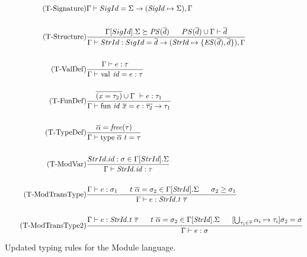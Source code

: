 \begin{figure}[htbp]
\begin{align*}
\tag{T-Signature}
&\Gamma \vdash SigId = \Sigma \rightarrow (\mathit{SigId} \mapsto \Sigma),\Gamma
\\
\\
\tag{T-Structure}
&\frac
{\Gamma[SigId].\Sigma \succeq \mathit{PS}(\overline{d}) \longspace PS(\overline{d}) \cup \Gamma \vdash \overline{d}}
{\Gamma \vdash StrId : SigId = \overline{d} \rightarrow (\mathit{StrId} \mapsto \lbrace \mathit{ES}(\overline{d}), \overline{d}\rbrace),\Gamma}
\\
\\
\tag{T-ValDef}
&\frac
{\Gamma \vdash e:\tau}
{\Gamma \vdash \text{\lsttext{val}}\ \mathit{id} = e:\tau}
\\
\\
\tag{T-FunDef}
&\frac
{\overline{(x = \tau_{2})} \cup \Gamma\ \vdash e:\tau_{1}}
{\Gamma \vdash \text{\lsttext{fun}}\ \mathit{id}\ \overline{x}= e:\overline{\tau_{2}} \rightarrow \tau_{1}}
\\
\\
\tag{T-TypeDef}
&\frac
{\overline{\alpha} = \mathit{free(\tau)}}
{\Gamma \vdash \text{\lsttext{type}}\ \overline{\alpha}\ t = \tau}
\\
\\
\tag{T-ModVar}
&\frac
{StrId.id:\sigma \in \Gamma[StrId].\Sigma}
{\Gamma \vdash \mathit{StrId.id} : \tau}
\\
\\
\tag{T-ModTransType}
&\frac
{\Gamma \vdash e:\sigma_{1} \longspace t\ \overline{\alpha} = \sigma_{2} \in \Gamma[\mathit{StrId}].\Sigma \longspace \sigma_{2} \geq \sigma_{1}}
{\Gamma \vdash e : \mathit{StrId.t}\ \overline{\tau}}
\\
\\
\tag{T-ModTransType2}
&\frac
{\Gamma \vdash e:\mathit{StrId.t}\ \overline{\tau} \longspace t\ \overline{\alpha} = \sigma_{2} \in \Gamma[\mathit{StrId}].\Sigma \longspace [\bigcup_{\tau_{i} \in \overline{\tau}} \alpha_{i} \mapsto \tau_{i}]\sigma_{2} = \sigma}
{\Gamma \vdash e:\sigma}
\end{align*}
\caption[Updated Typing Rules: Module Language]{Updated typing rules for the Module language. \label{fig:UpdatedTypeRulesModule}}
\end{figure}


